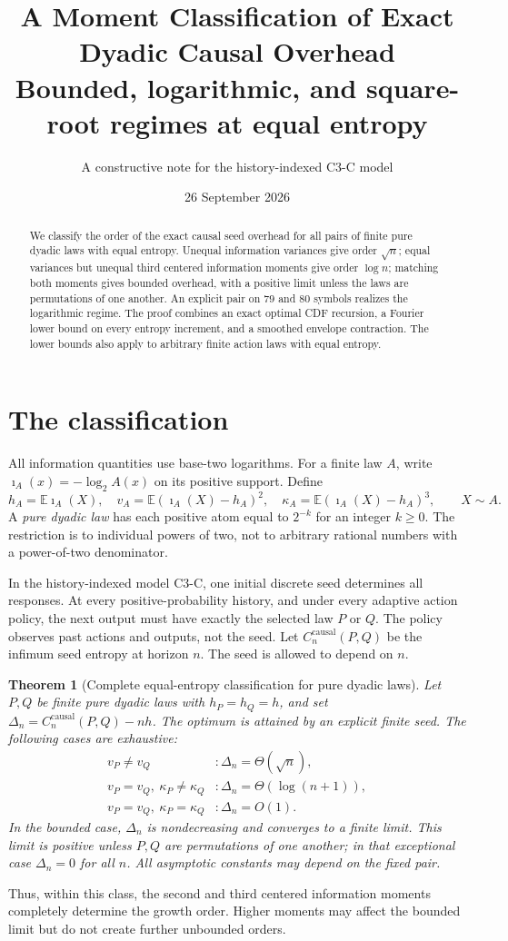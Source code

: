 \documentclass[11pt,a4paper]{article}
\title{A Moment Classification of Exact Dyadic Causal Overhead\\[3pt]
\large Bounded, logarithmic, and square-root regimes at equal entropy}
\author{A constructive note for the history-indexed C3-C model}
\date{26 September 2026}
\newtheorem{theorem}{Theorem}
\newcommand{\E}{\mathbb E}
\newcommand{\ii}{\imath}
\begin{document}
\maketitle
\begin{abstract}
We classify the order of the exact causal seed overhead for all pairs of
finite pure dyadic laws with equal entropy. Unequal information variances
give order $\sqrt n$; equal variances but unequal third centered information
moments give order $\log n$; matching both moments gives bounded overhead,
with a positive limit unless the laws are permutations of one another.
An explicit pair on $79$ and $80$ symbols realizes the logarithmic regime.
The proof combines an exact optimal CDF recursion, a Fourier lower bound
on every entropy increment, and a smoothed envelope contraction. The lower
bounds also apply to arbitrary finite action laws with equal entropy.
\end{abstract}

\section{The classification}
All information quantities use base-two logarithms. For a finite law $A$,
write $\ii_A(x)=-\log_2 A(x)$ on its positive support. Define
\[
h_A=\E\ii_A(X),\quad
v_A=\E(\ii_A(X)-h_A)^2,\quad
\kappa_A=\E(\ii_A(X)-h_A)^3,\qquad X\sim A.
\]
A \emph{pure dyadic law} has each positive atom equal to $2^{-k}$ for an
integer $k\ge0$. The restriction is to individual powers of two, not to
arbitrary rational numbers with a power-of-two denominator.

In the history-indexed model C3-C, one initial discrete seed determines
all responses. At every positive-probability history, and under every
adaptive action policy, the next output must have exactly the selected
law $P$ or $Q$. The policy observes past actions and outputs, not the seed.
Let $C_n^{\mathrm{causal}}(P,Q)$ be the infimum seed entropy at horizon $n$.
The seed is allowed to depend on $n$.

\begin{theorem}[Complete equal-entropy classification for pure dyadic laws]
\label{thm:classification}
Let $P,Q$ be finite pure dyadic laws with $h_P=h_Q=h$, and set
$\Delta_n=C_n^{\mathrm{causal}}(P,Q)-nh$.
The optimum is attained by an explicit finite seed. The following cases
are exhaustive:
\[
\boxed{
\begin{array}{ll}
v_P\ne v_Q &: \Delta_n=\Theta(\sqrt n),\\[2pt]
v_P=v_Q,\ \kappa_P\ne\kappa_Q &: \Delta_n=\Theta(\log(n+1)),\\[2pt]
v_P=v_Q,\ \kappa_P=\kappa_Q &: \Delta_n=O(1).
\end{array}}
\]
In the bounded case, $\Delta_n$ is nondecreasing and converges to a finite
limit. This limit is positive unless $P,Q$ are permutations of one another;
in that exceptional case $\Delta_n=0$ for all $n$.
All asymptotic constants may depend on the fixed pair.
\end{theorem}
Thus, within this class, the second and third centered information
moments completely determine the growth order. Higher moments may affect
the bounded limit but do not create further unbounded orders.
\end{document}
